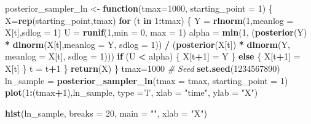 \documentclass[]{article}
\newenvironment{Shaded}{\begin{snugshade}}{\end{snugshade}}
\newcommand{\CommentTok}[1]{\textcolor[rgb]{0.56,0.35,0.01}{\textit{#1}}}
\newcommand{\ControlFlowTok}[1]{\textcolor[rgb]{0.13,0.29,0.53}{\textbf{#1}}}
\newcommand{\DataTypeTok}[1]{\textcolor[rgb]{0.13,0.29,0.53}{#1}}
\newcommand{\DecValTok}[1]{\textcolor[rgb]{0.00,0.00,0.81}{#1}}
\newcommand{\KeywordTok}[1]{\textcolor[rgb]{0.13,0.29,0.53}{\textbf{#1}}}
\newcommand{\NormalTok}[1]{#1}
\newcommand{\OperatorTok}[1]{\textcolor[rgb]{0.81,0.36,0.00}{\textbf{#1}}}
\newcommand{\StringTok}[1]{\textcolor[rgb]{0.31,0.60,0.02}{#1}}
\begin{document}
\begin{Shaded}
\begin{Highlighting}[]
\NormalTok{posterior_sampler_ln <-}\StringTok{ }\ControlFlowTok{function}\NormalTok{(}\DataTypeTok{tmax=}\DecValTok{1000}\NormalTok{, }\DataTypeTok{starting_point =} \DecValTok{1}\NormalTok{) \{}
\NormalTok{  X=}\KeywordTok{rep}\NormalTok{(starting_point,tmax)}
  \ControlFlowTok{for}\NormalTok{ (t }\ControlFlowTok{in} \DecValTok{1}\OperatorTok{:}\NormalTok{tmax) \{}
\NormalTok{    Y =}\StringTok{ }\KeywordTok{rlnorm}\NormalTok{(}\DecValTok{1}\NormalTok{,}\DataTypeTok{meanlog =}\NormalTok{ X[t],}\DataTypeTok{sdlog =} \DecValTok{1}\NormalTok{)}
\NormalTok{    U =}\StringTok{ }\KeywordTok{runif}\NormalTok{(}\DecValTok{1}\NormalTok{,}\DataTypeTok{min =} \DecValTok{0}\NormalTok{, }\DataTypeTok{max =} \DecValTok{1}\NormalTok{)}
\NormalTok{    alpha =}\StringTok{ }\KeywordTok{min}\NormalTok{(}\DecValTok{1}\NormalTok{,}
\NormalTok{                (}\KeywordTok{posterior}\NormalTok{(Y) }\OperatorTok{*}\StringTok{ }\KeywordTok{dlnorm}\NormalTok{(X[t],}\DataTypeTok{meanlog =}\NormalTok{ Y, }\DataTypeTok{sdlog =} \DecValTok{1}\NormalTok{)) }\OperatorTok{/}
\StringTok{                }\NormalTok{(}\KeywordTok{posterior}\NormalTok{(X[t]) }\OperatorTok{*}\StringTok{ }\KeywordTok{dlnorm}\NormalTok{(Y, }\DataTypeTok{meanlog =}\NormalTok{ X[t], }\DataTypeTok{sdlog =} \DecValTok{1}\NormalTok{)))}
    \ControlFlowTok{if}\NormalTok{ (U }\OperatorTok{<}\StringTok{ }\NormalTok{alpha) \{}
\NormalTok{      X[t}\OperatorTok{+}\DecValTok{1}\NormalTok{] =}\StringTok{ }\NormalTok{Y}
\NormalTok{    \} }\ControlFlowTok{else}\NormalTok{ \{}
\NormalTok{      X[t}\OperatorTok{+}\DecValTok{1}\NormalTok{] =}\StringTok{ }\NormalTok{X[t]}
\NormalTok{    \}}
\NormalTok{    t =}\StringTok{ }\NormalTok{t}\OperatorTok{+}\DecValTok{1}
\NormalTok{  \}}
  \KeywordTok{return}\NormalTok{(X)}
\NormalTok{\}}
\NormalTok{tmax=}\DecValTok{1000}
\CommentTok{# Seed}
\KeywordTok{set.seed}\NormalTok{(}\DecValTok{1234567890}\NormalTok{)}
\NormalTok{ln_sample =}\StringTok{ }\KeywordTok{posterior_sampler_ln}\NormalTok{(}\DataTypeTok{tmax =}\NormalTok{ tmax, }\DataTypeTok{starting_point =} \DecValTok{1}\NormalTok{)}
\KeywordTok{plot}\NormalTok{(}\DecValTok{1}\OperatorTok{:}\NormalTok{(tmax}\OperatorTok{+}\DecValTok{1}\NormalTok{),ln_sample, }\DataTypeTok{type =}\StringTok{'l'}\NormalTok{, }\DataTypeTok{xlab =} \StringTok{"time"}\NormalTok{, }\DataTypeTok{ylab =} \StringTok{"X"}\NormalTok{)}

\KeywordTok{hist}\NormalTok{(ln_sample, }\DataTypeTok{breaks =} \DecValTok{20}\NormalTok{, }\DataTypeTok{main =} \StringTok{""}\NormalTok{, }\DataTypeTok{xlab =} \StringTok{"X"}\NormalTok{)}


\end{Highlighting}
\end{Shaded}
\end{document}

